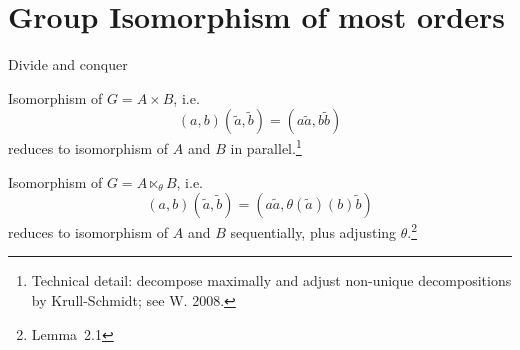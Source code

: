 \documentclass{beamer}
\begin{document}







\section{Group Isomorphism of most orders}

\begin{frame}{Divide and conquer}

Isomorphism of $G=A\times B$, i.e.
\[(a,b)(\tilde{a},\tilde{b}) = (a\tilde{a},b\tilde{b})\] reduces to isomorphism
of $A$ and $B$ in parallel.\footnote{Technical detail: decompose maximally and
adjust non-unique decompositions by Krull-Schmidt; see W. 2008.}
\pause

Isomorphism of $G=A\ltimes_{\theta} B$, i.e.
\[(a,b)(\tilde{a},\tilde{b})=(a\tilde{a},\theta(\tilde{a})(b)\tilde{b})\]
reduces to isomorphism of $A$ and $B$
sequentially, plus adjusting $\theta$.\footnote{Lemma~2.1}

\end{frame}


\end{document}
